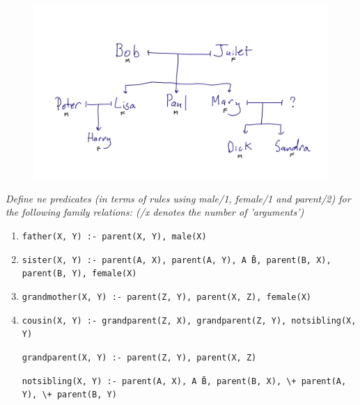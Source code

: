 \documentclass{report}
\newcommand{\code}[1]{\texttt{#1}}
\begin{document}
\begin{figure}[h]
    \centering
    \includegraphics[width=1\textwidth]{Family_Tree.png}
    \label{fig:Family_Tree}
\end{figure}

\noindent\emph{Define ne predicates (in terms of rules using male/1, female/1 and parent/2) for the following family relations: (/x denotes the number of 'arguments')}

\begin{enumerate}[label=(\alph*)]
    \item \code{father(X, Y) :- parent(X, Y), male(X)}
    \item \code{sister(X, Y) :- parent(A, X), parent(A, Y), A \= B, parent(B, X), parent(B, Y), female(X)}
    \item \code{grandmother(X, Y) :- parent(Z, Y), parent(X, Z), female(X)}
    \item \code{cousin(X, Y) :- grandparent(Z, X), grandparent(Z, Y), notsibling(X, Y)}
    
    \code{grandparent(X, Y) :- parent(Z, Y), parent(X, Z)}

    \code{notsibling(X, Y) :- parent(A, X), A \= B, parent(B, X), \textbackslash+ parent(A, Y), \textbackslash+ parent(B, Y)}
    

\end{enumerate}
\end{document}
